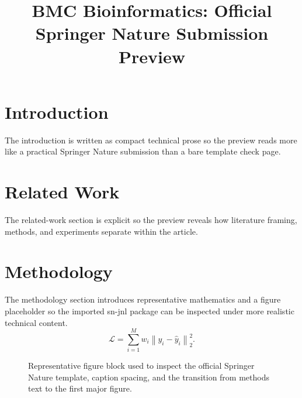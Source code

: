 \documentclass[pdflatex,sn-vancouver-num]{sn-jnl}
\begin{document}
\title[Article Title]{BMC Bioinformatics: Official Springer Nature Submission Preview}
\author*[1]{ }
\author[2]{ }
\maketitle
\section{Introduction}
The introduction is written as compact technical prose so the preview reads more like a practical Springer Nature submission than a bare template check page.
\section{Related Work}
The related-work section is explicit so the preview reveals how literature framing, methods, and experiments separate within the article.
\section{Methodology}
The methodology section introduces representative mathematics and a figure placeholder so the imported sn-jnl package can be inspected under more realistic technical content.
\begin{equation}
\mathcal{L} = \sum_{i=1}^{M} w_i \left\| y_i - \hat{y}_i \right\|_2^2.
\end{equation}
\begin{figure}[t]
\centering
{}
\caption{Representative figure block used to inspect the official Springer Nature template, caption spacing, and the transition from methods text to the first major figure.}
\end{figure}
\end{document}
